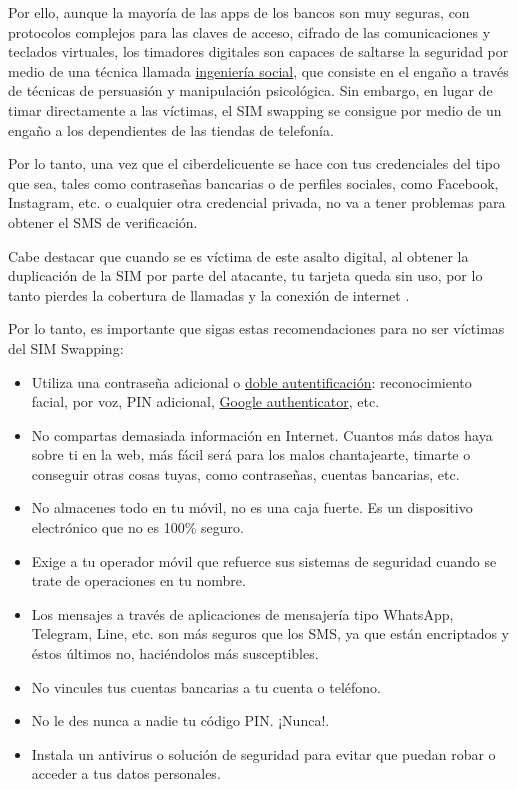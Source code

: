 \documentclass[
  a4paper,
  openany]{book}
\begin{document}
Por ello, aunque la mayoría de las apps de los bancos son muy seguras, con protocolos complejos para las claves de acceso, cifrado de las comunicaciones y teclados virtuales, los timadores digitales son capaces de saltarse la seguridad por medio de una técnica llamada \href{https://es.wikipedia.org/wiki/Ingeniería_social_(seguridad_informática)}{ingeniería social}, que consiste en el engaño a través de técnicas de persuasión y manipulación psicológica. Sin embargo, en lugar de timar directamente a las víctimas, el SIM swapping se consigue por medio de un engaño a los dependientes de las tiendas de telefonía.

Por lo tanto, una vez que el ciberdelicuente se hace con tus credenciales del tipo que sea, tales como contraseñas bancarias o de perfiles sociales, como Facebook, Instagram, etc. o cualquier otra credencial privada, no va a tener problemas para obtener el SMS de verificación.

Cabe destacar que cuando se es víctima de este asalto digital, al obtener la duplicación de la SIM por parte del atacante, tu tarjeta queda sin uso, por lo tanto pierdes la cobertura de llamadas y la conexión de internet \citep{PANDA-sim}.

Por lo tanto, es importante que sigas estas recomendaciones para no ser víctimas del SIM Swapping:

\begin{itemize}
\item
  Utiliza una contraseña adicional o \href{https://www.osi.es/es/actualidad/blog/2019/02/27/el-factor-de-autenticacion-doble-y-multiple}{doble autentificación}: reconocimiento facial, por voz, PIN adicional, \href{https://play.google.com/store/apps/details?id=com.google.android.apps.authenticator2\&hl=es\&gl=US}{Google authenticator}, etc.
\item
  No compartas demasiada información en Internet. Cuantos más datos haya sobre ti en la web, más fácil será para los malos chantajearte, timarte o conseguir otras cosas tuyas, como contraseñas, cuentas bancarias, etc.
\item
  No almacenes todo en tu móvil, no es una caja fuerte. Es un dispositivo electrónico que no es 100\% seguro.
\item
  Exige a tu operador móvil que refuerce sus sistemas de seguridad cuando se trate de operaciones en tu nombre.
\item
  Los mensajes a través de aplicaciones de mensajería tipo WhatsApp, Telegram, Line, etc. son más seguros que los SMS, ya que están encriptados y éstos últimos no, haciéndolos más susceptibles.
\item
  No vincules tus cuentas bancarias a tu cuenta o teléfono.
\item
  No le des nunca a nadie tu código PIN. ¡Nunca!.
\item
  Instala un antivirus o solución de seguridad para evitar que puedan robar o acceder a tus datos personales.
\end{itemize}
\end{document}
